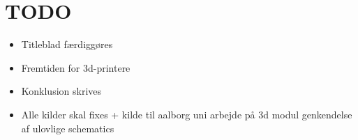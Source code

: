 \chapter{TODO} %
\label{cha:todo}

\begin{itemize}
	\item Titleblad færdiggøres
	\item Fremtiden for 3d-printere
	\item Konklusion skrives
	\item Alle kilder skal fixes + kilde til aalborg uni arbejde på 3d modul genkendelse af ulovlige schematics
\end{itemize}


